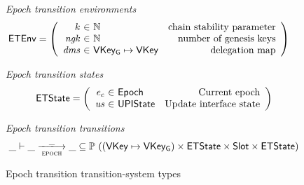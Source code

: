 \documentclass[11pt,a4paper]{article}
\newcommand{\powerset}[1]{\mathbb{P}~#1}
\newcommand{\var}[1]{\mathit{#1}}
\newcommand{\type}[1]{\mathsf{#1}}
\newcommand{\trans}[2]{\xlongrightarrow[\textsc{#1}]{#2}}
\newcommand{\Slot}{\type{Slot}}
\newcommand{\VKey}{\type{VKey}}
\newcommand{\VKeyGen}{\type{VKey_G}}
\begin{document}
\begin{figure}[ht]
  \emph{Epoch transition environments}
  \begin{align*}
    & \ETEnv
      = \left(
      \begin{array}{r@{~\in~}lr}
        k & \mathbb{N} & \text{chain stability parameter}\\
        \var{ngk} & \mathbb{N} & \text{number of genesis keys}\\
        \var{dms} & \VKeyGen \mapsto \VKey & \text{delegation map}\\
      \end{array}\right)
  \end{align*}

  \emph{Epoch transition states}
  \begin{equation*}
    \ETState =
    \left(
      \begin{array}{r@{~\in~}lr}
        \var{e_c} & \Epoch & \text{Current epoch} \\
        \var{us} & \UPIState & \text{Update interface state}
      \end{array}
    \right)
  \end{equation*}

  \emph{Epoch transition transitions}
  \begin{equation*}
    \_ \vdash \var{\_} \trans{epoch}{\_} \var{\_} \subseteq
    \powerset ((\VKey \mapsto \VKeyGen) \times \ETState \times \Slot \times \ETState)
  \end{equation*}
  \caption{Epoch transition transition-system types}
  \label{fig:ts-types:epoch}
\end{figure}
\end{document}
